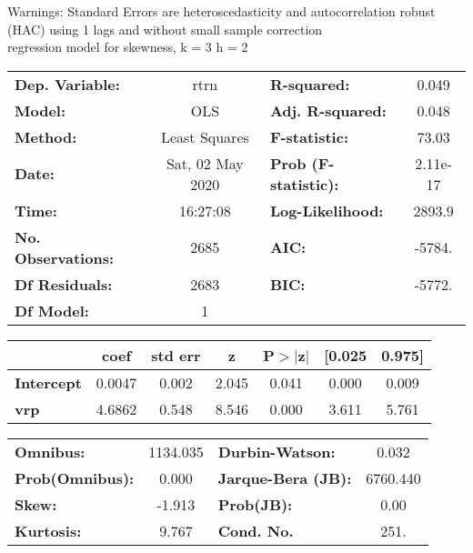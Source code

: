 Warnings: \newline
 [1] Standard Errors are heteroscedasticity and autocorrelation robust (HAC) using 1 lags and without small sample correction\\ 

regression model for skewness, k = 3 h = 2\begin{center}
\begin{tabular}{lclc}
\toprule
\textbf{Dep. Variable:}    &       rtrn       & \textbf{  R-squared:         } &     0.049   \\
\textbf{Model:}            &       OLS        & \textbf{  Adj. R-squared:    } &     0.048   \\
\textbf{Method:}           &  Least Squares   & \textbf{  F-statistic:       } &     73.03   \\
\textbf{Date:}             & Sat, 02 May 2020 & \textbf{  Prob (F-statistic):} &  2.11e-17   \\
\textbf{Time:}             &     16:27:08     & \textbf{  Log-Likelihood:    } &    2893.9   \\
\textbf{No. Observations:} &        2685      & \textbf{  AIC:               } &    -5784.   \\
\textbf{Df Residuals:}     &        2683      & \textbf{  BIC:               } &    -5772.   \\
\textbf{Df Model:}         &           1      & \textbf{                     } &             \\
\bottomrule
\end{tabular}
\begin{tabular}{lcccccc}
                   & \textbf{coef} & \textbf{std err} & \textbf{z} & \textbf{P$> |$z$|$} & \textbf{[0.025} & \textbf{0.975]}  \\
\midrule
\textbf{Intercept} &       0.0047  &        0.002     &     2.045  &         0.041        &        0.000    &        0.009     \\
\textbf{vrp}       &       4.6862  &        0.548     &     8.546  &         0.000        &        3.611    &        5.761     \\
\bottomrule
\end{tabular}
\begin{tabular}{lclc}
\textbf{Omnibus:}       & 1134.035 & \textbf{  Durbin-Watson:     } &    0.032  \\
\textbf{Prob(Omnibus):} &   0.000  & \textbf{  Jarque-Bera (JB):  } & 6760.440  \\
\textbf{Skew:}          &  -1.913  & \textbf{  Prob(JB):          } &     0.00  \\
\textbf{Kurtosis:}      &   9.767  & \textbf{  Cond. No.          } &     251.  \\
\bottomrule
\end{tabular}
\end{center}

